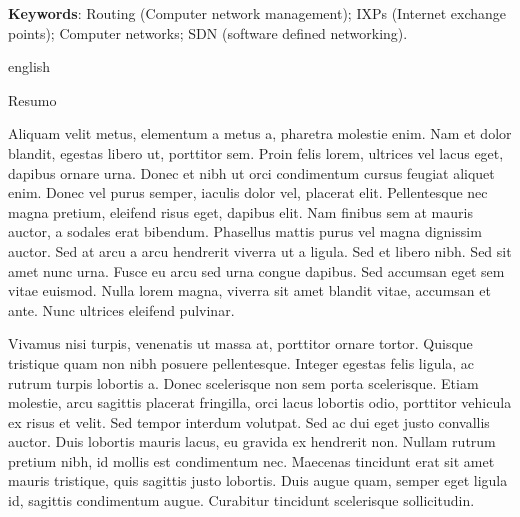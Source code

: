 \begin{resumo}
\vspace{\onelineskip}

\noindent\textbf{Keywords}: Routing (Computer network management); IXPs (Internet exchange points); Computer networks; SDN (software defined networking).
    
\newpage
\begin{otherlanguage*}{english}
\begin{center}{\ABNTEXchapterfont\huge Resumo}\end{center}
     Aliquam velit metus, elementum a metus a, pharetra molestie enim. Nam et dolor blandit, egestas libero ut, porttitor sem. Proin felis lorem, ultrices vel lacus eget, dapibus ornare urna. Donec et nibh ut orci condimentum cursus feugiat aliquet enim. Donec vel purus semper, iaculis dolor vel, placerat elit. Pellentesque nec magna pretium, eleifend risus eget, dapibus elit. Nam finibus sem at mauris auctor, a sodales erat bibendum. Phasellus mattis purus vel magna dignissim auctor. Sed at arcu a arcu hendrerit viverra ut a ligula. Sed et libero nibh. Sed sit amet nunc urna. Fusce eu arcu sed urna congue dapibus. Sed accumsan eget sem vitae euismod. Nulla lorem magna, viverra sit amet blandit vitae, accumsan et ante. Nunc ultrices eleifend pulvinar.

Vivamus nisi turpis, venenatis ut massa at, porttitor ornare tortor. Quisque tristique quam non nibh posuere pellentesque. Integer egestas felis ligula, ac rutrum turpis lobortis a. Donec scelerisque non sem porta scelerisque. Etiam molestie, arcu sagittis placerat fringilla, orci lacus lobortis odio, porttitor vehicula ex risus et velit. Sed tempor interdum volutpat. Sed ac dui eget justo convallis auctor. Duis lobortis mauris lacus, eu gravida ex hendrerit non. Nullam rutrum pretium nibh, id mollis est condimentum nec. Maecenas tincidunt erat sit amet mauris tristique, quis sagittis justo lobortis. Duis augue quam, semper eget ligula id, sagittis condimentum augue. Curabitur tincidunt scelerisque sollicitudin. 


\end{otherlanguage*}
\end{resumo}
